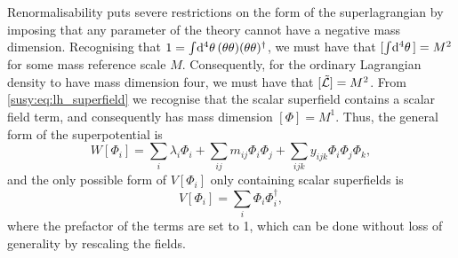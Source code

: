 \documentclass[../main.tex]{subfiles}
\begin{document}
Renormalisability puts severe restrictions on the form of the superlagrangian by imposing that any parameter of the theory cannot have a negative mass dimension.
Recognising that \(1 = \int \!\mathrm{d}^4\theta\, (\theta\theta)(\theta\theta)^\dagger\), we must have that \([\int \!\mathrm{d}^4\theta\,] = M^2\) for some mass reference scale \(M\).
Consequently, for the ordinary Lagrangian density to have mass dimension four, we must have that \([\tilde{\mathcal{L}}] = M^2\).
From \cref{susy:eq:lh_superfield} we recognise that the scalar superfield contains a scalar field term, and consequently has mass dimension \([\Phi] = M^1\).
Thus, the general form of the superpotential is
\begin{equation}
  W[\Phi_i] = \sum_i \lambda_i\Phi_i + \sum_{ij} m_{ij}\Phi_i \Phi_j + \sum_{ijk} y_{ijk} \Phi_i \Phi_j \Phi_k,
\end{equation}
and the only possible form of \(V[\Phi_i]\) only containing scalar superfields is
\begin{equation}
  V[\Phi_i] = \sum_i \Phi_i \Phi_i^\dagger,
\end{equation}
where the prefactor of the terms are set to 1, which can be done without loss of generality by rescaling the fields.
\end{document}
